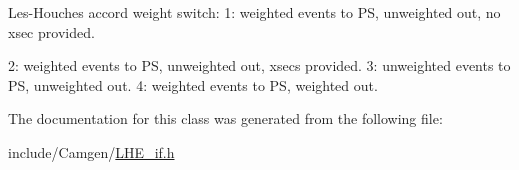 Les-\/\+Houches accord weight switch\+: 1\+: weighted events to P\+S, unweighted out, no xsec provided. 

2\+: weighted events to P\+S, unweighted out, xsecs provided. 3\+: unweighted events to P\+S, unweighted out. 4\+: weighted events to P\+S, weighted out. 

The documentation for this class was generated from the following file\+:\begin{DoxyCompactItemize}
\item 
include/\+Camgen/\hyperlink{a00679}{L\+H\+E\+\_\+if.\+h}\end{DoxyCompactItemize}
